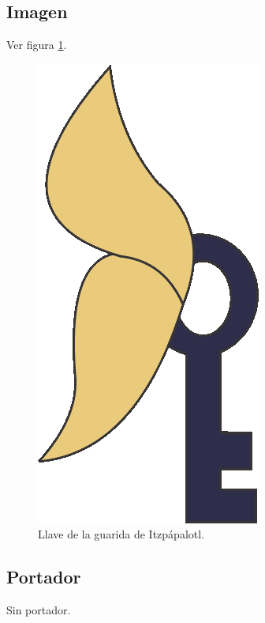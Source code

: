 		\subsection{Imagen}
		Ver figura \ref{fig:llaveMariposa}.
		\begin{figure}
			\centering
			\includegraphics[height=0.2 \textheight]{Imagenes/items}
			\caption{Llave de la guarida de Itzpápalotl.}
			\label{fig:llaveMariposa}
		\end{figure}
	\subsection{Portador}
	Sin portador. 